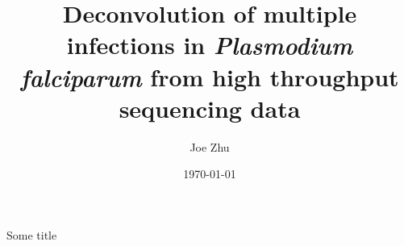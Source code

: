 \documentclass[xcolor=xelatex,aspectratio=68]{beamer}
\author{Joe Zhu}
\title[DEploid]{Deconvolution of multiple infections in \newline
{\it Plasmodium falciparum}\newline
from high throughput sequencing data
}
\institute{University of Oxford}
\date{\today}
\begin{document}
\begin{frame}[plain]
\titlepage
\end{frame}

\begin{frame}{Some title}
\end{frame}
\end{document}
